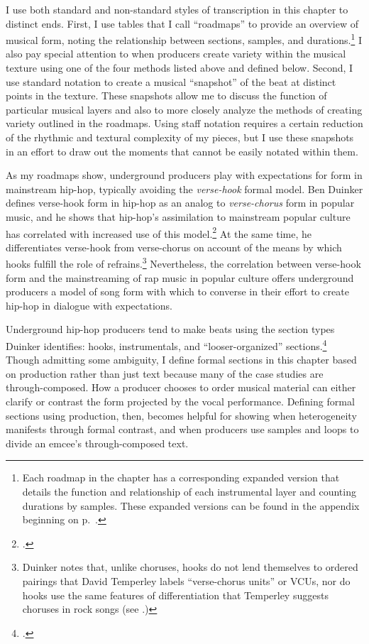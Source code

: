I use both standard and non-standard styles of transcription in this chapter to distinct
ends. First, I use tables that I call ``roadmaps'' to provide an overview of musical form,
noting the  relationship between sections, samples, and durations.\footnote{
    Each roadmap in the chapter has a corresponding expanded version that details the 
    function and relationship of each instrumental layer and counting durations by 
    samples. These expanded versions can be found in the appendix beginning on
    p.~\pageref{appendix:fullroadmaps}.} 
I also pay special attention to when producers create variety within the musical texture
using one of the four methods listed above and defined below. Second, I use standard
notation to create a musical ``snapshot'' of the beat at distinct points in the texture.
These snapshots allow me to discuss the function of particular musical layers and also to
more closely analyze the methods of creating variety outlined in the roadmaps. Using staff
notation requires a certain reduction of the rhythmic and textural complexity of my pieces,
but I use these snapshots in an effort to draw out the moments that cannot be easily notated
within them.

As my roadmaps show, underground producers play with expectations for form in mainstream
hip-hop, typically avoiding the \emph{verse-hook} formal model. Ben Duinker defines 
verse-hook form in hip-hop as an analog to \emph{verse-chorus} form in popular music, and
he shows that hip-hop's assimilation to mainstream popular culture has correlated with
increased use of this model.\footnote{
    \autocite[105]{benduinkerSongFormMainstreaming2020}.}\label{duinkerhookdef}
At the same time, he differentiates verse-hook from verse-chorus on account of the means
by which hooks fulfill the role of refrains.\footnote{
    Duinker notes that, unlike choruses, hooks do not lend themselves to ordered 
    pairings that David Temperley labels ``verse-chorus units'' or VCUs, nor do 
    hooks use the same features of differentiation that Temperley suggests choruses
    in rock songs 
    (see \autocite[159\textit{ff}]{davidtemperleyMusicalLanguageRock2018}.)}
Nevertheless, the correlation between verse-hook form and the mainstreaming of rap music
in popular culture offers underground producers a model of song form with which to converse
in their  effort to create hip-hop in dialogue with expectations.

Underground hip-hop producers tend to make beats using the section types Duinker identifies:
hooks, instrumentals, and ``looser-organized'' sections.\footnote{
    \autocite[95--101]{benduinkerSongFormMainstreaming2020}.} 
Though admitting some ambiguity, I define formal sections in this chapter based on production
rather than just text because many of the case studies are through-composed. How a producer 
chooses to order musical material can either clarify or contrast the form projected by the
vocal performance. Defining formal sections using production, then, becomes helpful for
showing when heterogeneity manifests through formal contrast, and when producers use samples
and loops to divide an emcee's through-composed text.

